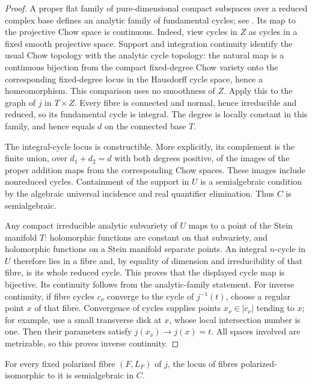 \begin{proof}
A proper flat family of pure-dimensional compact subspaces over a reduced complex base defines an analytic family of fundamental cycles; see \cite[p.~27, Remark~(iv)]{Barlet1999}. Its map to the projective Chow space is continuous. Indeed, view cycles in $Z$ as cycles in a fixed smooth projective space. Support and integration continuity \cite[\S2.4(b), Lemma~4 and \S2.5, Theorem~4]{AndreottiNorguet1967} identify the usual Chow topology with the analytic cycle topology: the natural map is a continuous bijection from the compact fixed-degree Chow variety onto the corresponding fixed-degree locus in the Hausdorff cycle space, hence a homeomorphism. This comparison uses no smoothness of $Z$.  Apply this to the graph of $j$ in $T\times Z$.  Every fibre is connected and normal, hence irreducible and reduced, so its fundamental cycle is integral.  The degree is locally constant in this family, and hence equals $d$ on the connected base $T$.

The integral-cycle locus is constructible.  More explicitly, its complement is the finite union, over $d_1+d_2=d$ with both degrees positive, of the images of the proper addition maps from the corresponding Chow spaces.  These images include nonreduced cycles. Containment of the support in $U$ is a semialgebraic condition by the algebraic universal incidence and real quantifier elimination. Thus $C$ is semialgebraic.

Any compact irreducible analytic subvariety of $U$ maps to a point of the Stein manifold $T$: holomorphic functions are constant on that subvariety, and holomorphic functions on a Stein manifold separate points.  An integral $n$-cycle in $U$ therefore lies in a fibre and, by equality of dimension and irreducibility of that fibre, is its whole reduced cycle.  This proves that the displayed cycle map is bijective.  Its continuity follows from the analytic-family statement. For inverse continuity, if fibre cycles $c_\nu$ converge to the cycle of $j^{-1}(t)$, choose a regular point $x$ of that fibre.  Convergence of cycles supplies points $x_\nu\in|c_\nu|$ tending to $x$; for example, use a small transverse disk at $x$, whose local intersection number is one.  Then their parameters satisfy $j(x_\nu)\to j(x)=t$.  All spaces involved are metrizable, so this proves inverse continuity.
\end{proof}

\begin{lemma}
\label{lem:cmp-polarized-locus}
For every fixed polarized fibre $(F,L_F)$ of $j$, the locus of fibres polarized-isomorphic to it is semialgebraic in $C$.
\end{lemma}

